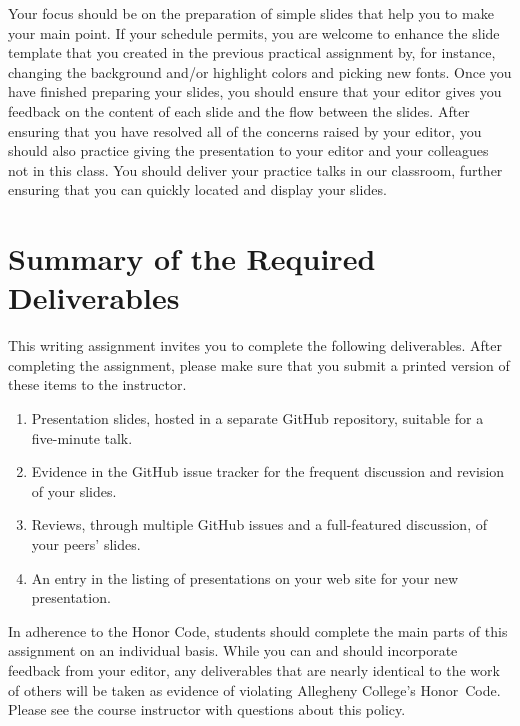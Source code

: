 Your focus should be on the preparation of simple slides that help you to make your main point. If your schedule
permits, you are welcome to enhance the slide template that you created in the previous practical assignment by, for
instance, changing the background and/or highlight colors and picking new fonts. Once you have finished preparing your
slides, you should ensure that your editor gives you feedback on the content of each slide and the flow between the
slides. After ensuring that you have resolved all of the concerns raised by your editor, you should also practice giving
the presentation to your editor and your colleagues not in this class. You should deliver your practice talks in our
classroom, further ensuring that you can quickly located and display your slides.

\vspace*{-.1in}
\section*{Summary of the Required Deliverables}

This writing assignment invites you to complete the following deliverables. After completing the assignment, please make
sure that you submit a printed version of these items to the instructor.

\vspace*{-.1in}
\begin{enumerate}
  \setlength{\itemsep}{-.01in}

  \item Presentation slides, hosted in a separate GitHub repository, suitable for a five-minute talk.
  \item Evidence in the GitHub issue tracker for the frequent discussion and revision of your slides.
  \item Reviews, through multiple GitHub issues and a full-featured discussion, of your peers' slides.
  \item An entry in the listing of presentations on your web site for your new presentation.

\end{enumerate}
\vspace*{-.1in}

In adherence to the Honor Code, students should complete the main parts of this assignment on an individual basis. While
you can and should incorporate feedback from your editor, any deliverables that are nearly identical to the work of
others will be taken as evidence of violating Allegheny College's \mbox{Honor Code}. Please see the course instructor
with questions about this policy.


